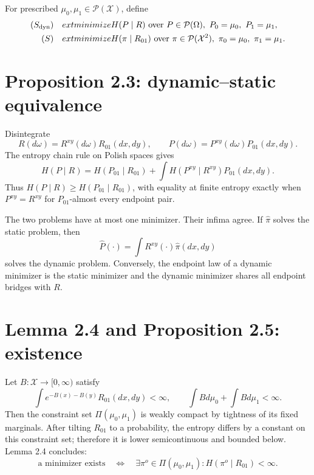 For prescribed \(\mu_0,\mu_1\in\mathcal P(\mathcal X)\), define
\begin{align}
 (S_{\rm dyn})\quad&	ext{minimize }H(P\mid R)
   \text{ over }P\in\mathcal P(\Omega),\ P_0=\mu_0,\ P_1=\mu_1,
   \label{eq:leo-Sdyn}\\
 (S)\quad&	ext{minimize }H(\pi\mid R_{01})
   \text{ over }\pi\in\mathcal P(\mathcal X^2),\ \pi_0=\mu_0,\ \pi_1=\mu_1.
   \label{eq:leo-S}
\end{align}

\section{Proposition 2.3: dynamic--static equivalence}
Disintegrate
\[
 R(d\omega)=R^{xy}(d\omega)R_{01}(dx,dy),
 \qquad
 P(d\omega)=P^{xy}(d\omega)P_{01}(dx,dy).
\]
The entropy chain rule on Polish spaces gives
\begin{equation}\label{eq:leo-chain}
 H(P\mid R)=H(P_{01}\mid R_{01})+
 \int H(P^{xy}\mid R^{xy})P_{01}(dx,dy).
\end{equation}
Thus \(H(P\mid R)\ge H(P_{01}\mid R_{01})\), with equality at finite entropy exactly when
\(P^{xy}=R^{xy}\) for \(P_{01}\)-almost every endpoint pair.

\begin{proposition}[Proposition 2.3]
The two problems have at most one minimizer.  Their infima agree.  If \(\widehat\pi\) solves the
static problem, then
\begin{equation}\label{eq:leo-bridge-mixture}
 \widehat P(\cdot)=\int R^{xy}(\cdot)\widehat\pi(dx,dy)
\end{equation}
solves the dynamic problem.  Conversely, the endpoint law of a dynamic minimizer is the static
minimizer and the dynamic minimizer shares all endpoint bridges with \(R\).
\end{proposition}

\section{Lemma 2.4 and Proposition 2.5: existence}
Let \(B:\mathcal X\to[0,\infty)\) satisfy
\[
 \int e^{-B(x)-B(y)}R_{01}(dx,dy)<\infty,
 \qquad
 \int Bd\mu_0+\int Bd\mu_1<\infty.
\]
Then the constraint set \(\Pi(\mu_0,\mu_1)\) is weakly compact by tightness of its fixed marginals.
After tilting \(R_{01}\) to a probability, the entropy differs by a constant on this constraint set;
therefore it is lower semicontinuous and bounded below.  Lemma 2.4 concludes:
\begin{equation}\label{eq:leo-existence-criterion}
 \text{a minimizer exists}
 \quad\Longleftrightarrow\quad
 \exists\pi^o\in\Pi(\mu_0,\mu_1):H(\pi^o\mid R_{01})<\infty.
\end{equation}

